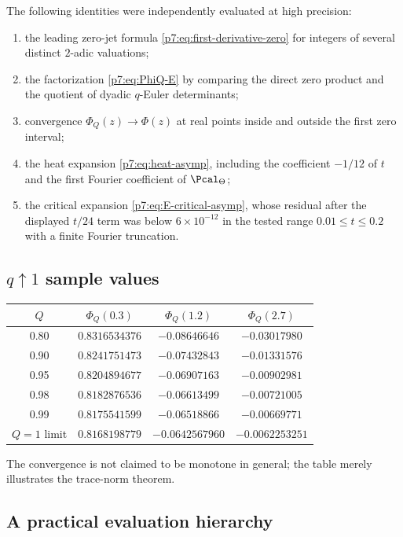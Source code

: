 \documentclass[11pt]{article}
\numberwithin{equation}{section}
\theoremstyle{definition}
\theoremstyle{remark}
\begin{document}
The following identities were independently evaluated at high precision:
\begin{enumerate}[leftmargin=2em]
\item the leading zero-jet formula \cref{p7:eq:first-derivative-zero} for integers of several distinct $2$-adic valuations;
\item the factorization \cref{p7:eq:PhiQ-E} by comparing the direct zero product and the quotient of dyadic $q$-Euler determinants;
\item convergence $\Phi_Q(z)\to\Phi(z)$ at real points inside and outside the first zero interval;
\item the heat expansion \cref{p7:eq:heat-asymp}, including the coefficient $-1/12$ of $t$ and the first Fourier coefficient of $\Pcal_\Theta$;
\item the critical expansion \cref{p7:eq:E-critical-asymp}, whose residual after the displayed $t/24$ term was below $6\times10^{-12}$ in the tested range $0.01\le t\le0.2$ with a finite Fourier truncation.
\end{enumerate}

\subsection{$q\uparrow1$ sample values}

\begin{center}
\small
\begin{tabular}{@{}c|ccc@{}}
\toprule
$Q$ & $\Phi_Q(0.3)$ & $\Phi_Q(1.2)$ & $\Phi_Q(2.7)$\\
\midrule
0.80 & $0.8316534376$ & $-0.08646646$ & $-0.03017980$\\
0.90 & $0.8241751473$ & $-0.07432843$ & $-0.01331576$\\
0.95 & $0.8204894677$ & $-0.06907163$ & $-0.00902981$\\
0.98 & $0.8182876536$ & $-0.06613499$ & $-0.00721005$\\
0.99 & $0.8175541599$ & $-0.06518866$ & $-0.00669771$\\
\midrule
$Q=1$ limit & $0.8168198779$ & $-0.0642567960$ & $-0.0062253251$\\
\bottomrule
\end{tabular}
\end{center}

The convergence is not claimed to be monotone in general; the table merely illustrates the trace-norm theorem.

\subsection{A practical evaluation hierarchy}
\end{document}
